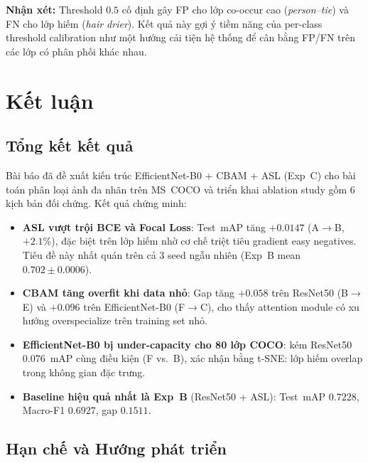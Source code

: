 \documentclass[conference]{IEEEtran}
\begin{document}
\textbf{Nhận xét:}
Threshold $0.5$ cố định gây FP cho lớp co-occur cao (\textit{person--tie})
và FN cho lớp hiếm (\textit{hair drier}).
Kết quả này gợi ý tiềm năng của per-class threshold calibration
như một hướng cải tiện hệ thống để cân bằng FP/FN trên các lớp có phân phối khác nhau.

\section{Kết luận}
\label{sec:conclusion}

\subsection{Tổng kết kết quả}

Bài báo đã đề xuất kiến trúc EfficientNet-B0 + CBAM + ASL (Exp~C)
cho bài toán phân loại ảnh đa nhãn trên MS~COCO và triển khai
ablation study gồm 6 kịch bản đối chứng. Kết quả chứng minh:

\begin{itemize}[leftmargin=1.8em]
  \item \textbf{ASL vượt trội BCE và Focal Loss}:
        Test~mAP tăng $+0.0147$ (A$\to$B, $+2.1\%$), đặc biệt
        trên lớp hiếm nhờ cơ chế triệt tiêu gradient easy negatives.
        Tiêu đề này nhất quán trên cả 3 seed ngẫu nhiên
        (Exp~B mean~$0.702 \pm 0.0006$).
  \item \textbf{CBAM tăng overfit khi data nhỏ}:
        Gap tăng $+0.058$ trên ResNet50 (B$\to$E)
        và $+0.096$ trên EfficientNet-B0 (F$\to$C),
        cho thấy attention module có xu hướng overspecialize
        trên training set nhỏ.
  \item \textbf{EfficientNet-B0 bị under-capacity cho 80 lớp COCO}:
        kém ResNet50 $0.076$~mAP cùng điều kiện (F vs.~B),
        xác nhận bằng t-SNE: lớp hiếm overlap trong không gian đặc trưng.
  \item \textbf{Baseline hiệu quả nhất là Exp~B} (ResNet50 + ASL):
        Test~mAP $0.7228$, Macro-F1 $0.6927$, gap $0.1511$.
\end{itemize}

\subsection{Hạn chế và Hướng phát triển}
\end{document}
